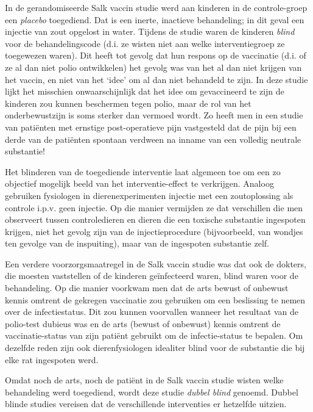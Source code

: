 \documentclass[
  dutch,
  letterpaper,
  12pt]{book}
\theoremstyle{definition}
\theoremstyle{definition}
\theoremstyle{definition}
\theoremstyle{remark}
\begin{document}
In de gerandomiseerde Salk vaccin studie werd aan kinderen in de
controle-groep een \emph{placebo} toegediend. Dat is een inerte,
inactieve behandeling; in dit geval een injectie van zout opgelost in
water. Tijdens de studie waren de kinderen \emph{blind} voor de
behandelingscode (d.i. ze wisten niet aan welke interventiegroep ze
toegewezen waren). Dit heeft tot gevolg dat hun respons op de vaccinatie
(d.i. of ze al dan niet polio ontwikkelen) het gevolg was van het al dan
niet krijgen van het vaccin, en niet van het `idee' om al dan niet
behandeld te zijn. In deze studie lijkt het misschien onwaarschijnlijk
dat het idee om gevaccineerd te zijn de kinderen zou kunnen beschermen
tegen polio, maar de rol van het onderbewustzijn is soms sterker dan
vermoed wordt. Zo heeft men in een studie van patiënten met ernstige
post-operatieve pijn vastgesteld dat de pijn bij een derde van de
patiënten spontaan verdween na inname van een volledig neutrale
substantie!

Het blinderen van de toegediende interventie laat algemeen toe om een zo
objectief mogelijk beeld van het interventie-effect te verkrijgen.
Analoog gebruiken fysiologen in dierenexperimenten injectie met een
zoutoplossing als controle i.p.v. geen injectie. Op die manier vermijden
ze dat verschillen die men observeert tussen controledieren en dieren
die een toxische substantie ingespoten krijgen, niet het gevolg zijn van
de injectieprocedure (bijvoorbeeld, van wondjes ten gevolge van de
inspuiting), maar van de ingespoten substantie zelf.

Een verdere voorzorgsmaatregel in de Salk vaccin studie was dat ook de
dokters, die moesten vaststellen of de kinderen geïnfecteerd waren,
blind waren voor de behandeling. Op die manier voorkwam men dat de arts
bewust of onbewust kennis omtrent de gekregen vaccinatie zou gebruiken
om een beslissing te nemen over de infectiestatus. Dit zou kunnen
voorvallen wanneer het resultaat van de polio-test dubieus was en de
arts (bewust of onbewust) kennis omtrent de vaccinatie-status van zijn
patiënt gebruikt om de infectie-status te bepalen. Om dezelfde reden
zijn ook dierenfysiologen idealiter blind voor de substantie die bij
elke rat ingespoten werd.

Omdat noch de arts, noch de patiënt in de Salk vaccin studie wisten
welke behandeling werd toegediend, wordt deze studie \emph{dubbel blind}
genoemd. Dubbel blinde studies vereisen dat de verschillende
interventies er hetzelfde uitzien.
\end{document}
